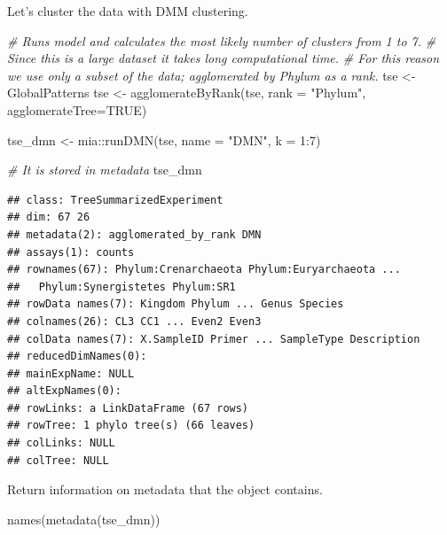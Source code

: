 \documentclass[
]{book}
\newenvironment{Shaded}{\begin{snugshade}}{\end{snugshade}}
\newcommand{\AttributeTok}[1]{\textcolor[rgb]{0.77,0.63,0.00}{#1}}
\newcommand{\CommentTok}[1]{\textcolor[rgb]{0.56,0.35,0.01}{\textit{#1}}}
\newcommand{\ConstantTok}[1]{\textcolor[rgb]{0.00,0.00,0.00}{#1}}
\newcommand{\DecValTok}[1]{\textcolor[rgb]{0.00,0.00,0.81}{#1}}
\newcommand{\FunctionTok}[1]{\textcolor[rgb]{0.00,0.00,0.00}{#1}}
\newcommand{\NormalTok}[1]{#1}
\newcommand{\OtherTok}[1]{\textcolor[rgb]{0.56,0.35,0.01}{#1}}
\newcommand{\SpecialCharTok}[1]{\textcolor[rgb]{0.00,0.00,0.00}{#1}}
\newcommand{\StringTok}[1]{\textcolor[rgb]{0.31,0.60,0.02}{#1}}
\begin{document}
Let's cluster the data with DMM clustering.

\begin{Shaded}
\begin{Highlighting}[]
\CommentTok{\# Runs model and calculates the most likely number of clusters from 1 to 7.}
\CommentTok{\# Since this is a large dataset it takes long computational time.}
\CommentTok{\# For this reason we use only a subset of the data; agglomerated by Phylum as a rank.}
\NormalTok{tse }\OtherTok{\textless{}{-}}\NormalTok{ GlobalPatterns}
\NormalTok{tse }\OtherTok{\textless{}{-}} \FunctionTok{agglomerateByRank}\NormalTok{(tse, }\AttributeTok{rank =} \StringTok{"Phylum"}\NormalTok{, }\AttributeTok{agglomerateTree=}\ConstantTok{TRUE}\NormalTok{)}
\end{Highlighting}
\end{Shaded}

\begin{Shaded}
\begin{Highlighting}[]
\NormalTok{tse\_dmn }\OtherTok{\textless{}{-}}\NormalTok{ mia}\SpecialCharTok{::}\FunctionTok{runDMN}\NormalTok{(tse, }\AttributeTok{name =} \StringTok{"DMN"}\NormalTok{, }\AttributeTok{k =} \DecValTok{1}\SpecialCharTok{:}\DecValTok{7}\NormalTok{)}
\end{Highlighting}
\end{Shaded}

\begin{Shaded}
\begin{Highlighting}[]
\CommentTok{\# It is stored in metadata}
\NormalTok{tse\_dmn}
\end{Highlighting}
\end{Shaded}

\begin{verbatim}
## class: TreeSummarizedExperiment 
## dim: 67 26 
## metadata(2): agglomerated_by_rank DMN
## assays(1): counts
## rownames(67): Phylum:Crenarchaeota Phylum:Euryarchaeota ...
##   Phylum:Synergistetes Phylum:SR1
## rowData names(7): Kingdom Phylum ... Genus Species
## colnames(26): CL3 CC1 ... Even2 Even3
## colData names(7): X.SampleID Primer ... SampleType Description
## reducedDimNames(0):
## mainExpName: NULL
## altExpNames(0):
## rowLinks: a LinkDataFrame (67 rows)
## rowTree: 1 phylo tree(s) (66 leaves)
## colLinks: NULL
## colTree: NULL
\end{verbatim}

Return information on metadata that the object contains.

\begin{Shaded}
\begin{Highlighting}[]
\FunctionTok{names}\NormalTok{(}\FunctionTok{metadata}\NormalTok{(tse\_dmn))}
\end{Highlighting}
\end{Shaded}
\end{document}
